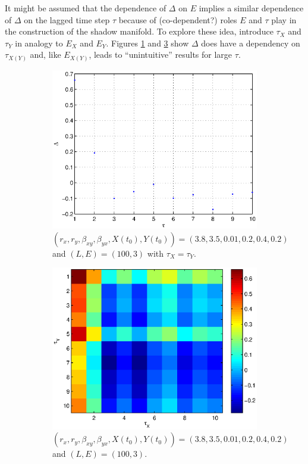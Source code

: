 \documentclass[a4paper,11pt]{article}
\begin{document}
It might be assumed that the dependence of $\Delta$ on $E$ implies a similar dependence of $\Delta$ on the lagged time step $\tau$ because of (co-dependent?) roles $E$ and $\tau$ play in the construction of the shadow manifold.  To explore these idea, introduce $\tau_X$ and $\tau_Y$ in analogy to $E_X$ and $E_Y$.  Figures \ref{fig:SugExvTauXY} and \ref{fig:SugExvTauXvTauY} show $\Delta$ does have a dependency on $\tau_{X (Y)}$ and, like $E_{X(Y)}$, leads to ``unintuitive'' results for large $\tau$.
\begin{figure}[h!t]
\centering
\begin{subfigure}[b]{0.4\textwidth}
\label{fig:SugExvTauXY}
\includegraphics[scale=0.55]{graphics/SugExvTauXY.eps}
\caption{ $\left(r_x,r_y,\beta_{xy},\beta_{yx},X(t_0),Y(t_0)\right) = \left(3.8,3.5,0.01,0.2,0.4,0.2\right)$ and $\left(L,E\right) = \left(100,3\right)$ with $\tau_X=\tau_Y$.}
\end{subfigure}
\begin{subfigure}[b]{0.4\textwidth}
\label{fig:SugExvTauXvTauY}
\includegraphics[scale=0.55]{graphics/SugExvTauXvTauY.eps}
\caption{ $\left(r_x,r_y,\beta_{xy},\beta_{yx},X(t_0),Y(t_0)\right) = \left(3.8,3.5,0.01,0.2,0.4,0.2\right)$ and $\left(L,E\right) = \left(100,3\right)$.}
\end{subfigure}
\caption{}
\end{figure}
\end{document}
